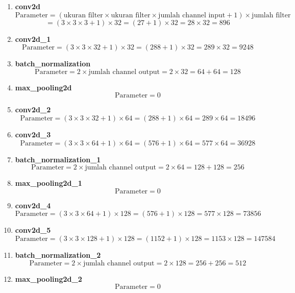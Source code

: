 \begin{enumerate}
    \item \textbf{conv2d}
    \[
    \text{Parameter} = (\text{ukuran filter} \times \text{ukuran filter} \times \text{jumlah channel input} + 1) \times \text{jumlah filter}
    \]
    \[
    = (3 \times 3 \times 3 + 1) \times 32 = (27 + 1) \times 32 = 28 \times 32 = 896
    \]

    \item \textbf{conv2d\_1}
    \[
    \text{Parameter} = (3 \times 3 \times 32 + 1) \times 32 = (288 + 1) \times 32 = 289 \times 32 = 9248
    \]

    \item \textbf{batch\_normalization}
    \[
    \text{Parameter} = 2 \times \text{jumlah channel output} = 2 \times 32 = 64 + 64 = 128
    \]

    \item \textbf{max\_pooling2d}
    \[
    \text{Parameter} = 0
    \]

    \item \textbf{conv2d\_2}
    \[
    \text{Parameter} = (3 \times 3 \times 32 + 1) \times 64 = (288 + 1) \times 64 = 289 \times 64 = 18496
    \]

    \item \textbf{conv2d\_3}
    \[
    \text{Parameter} = (3 \times 3 \times 64 + 1) \times 64 = (576 + 1) \times 64 = 577 \times 64 = 36928
    \]

    \item \textbf{batch\_normalization\_1}
    \[
    \text{Parameter} = 2 \times \text{jumlah channel output} = 2 \times 64 = 128 + 128 = 256
    \]

    \item \textbf{max\_pooling2d\_1}
    \[
    \text{Parameter} = 0
    \]

    \item \textbf{conv2d\_4}
    \[
    \text{Parameter} = (3 \times 3 \times 64 + 1) \times 128 = (576 + 1) \times 128 = 577 \times 128 = 73856
    \]

    \item \textbf{conv2d\_5}
    \[
    \text{Parameter} = (3 \times 3 \times 128 + 1) \times 128 = (1152 + 1) \times 128 = 1153 \times 128 = 147584
    \]

    \item \textbf{batch\_normalization\_2}
    \[
    \text{Parameter} = 2 \times \text{jumlah channel output} = 2 \times 128 = 256 + 256 = 512
    \]

    \item \textbf{max\_pooling2d\_2}
    \[
    \text{Parameter} = 0
    \]


\end{enumerate}
